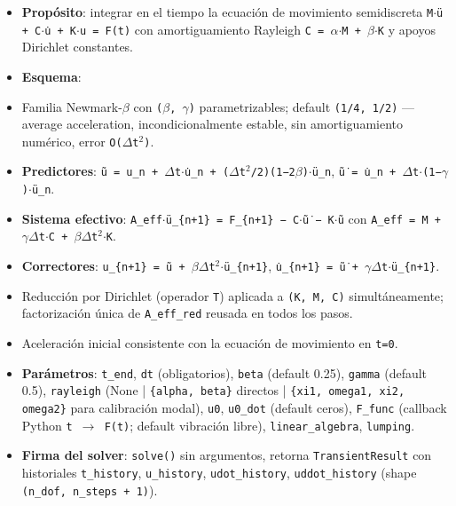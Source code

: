 \documentclass[11pt,letterpaper,oneside]{report}
\begin{document}
\begin{itemize}
  \item \textbf{Propósito}: integrar en el tiempo la ecuación de movimiento semidiscreta \texttt{M\ensuremath{\cdot}ü + C\ensuremath{\cdot}u̇ + K\ensuremath{\cdot}u = F(t)} con amortiguamiento Rayleigh \texttt{C = \ensuremath{\alpha}\ensuremath{\cdot}M + \ensuremath{\beta}\ensuremath{\cdot}K} y apoyos Dirichlet constantes.
  \item \textbf{Esquema}:
  \item Familia Newmark-\ensuremath{\beta} con \texttt{(\ensuremath{\beta}, \ensuremath{\gamma})} parametrizables; default \texttt{(1/4, 1/2)} --- average acceleration, incondicionalmente estable, sin amortiguamiento numérico, error \texttt{O(\ensuremath{\Delta}t\ensuremath{^{2}})}.
  \item \textbf{Predictores}: \texttt{ũ = u\_n + \ensuremath{\Delta}t\ensuremath{\cdot}u̇\_n + (\ensuremath{\Delta}t\ensuremath{^{2}}/2)(1−2\ensuremath{\beta})\ensuremath{\cdot}ü\_n}, \texttt{ũ̇ = u̇\_n + \ensuremath{\Delta}t\ensuremath{\cdot}(1−\ensuremath{\gamma})\ensuremath{\cdot}ü\_n}.
  \item \textbf{Sistema efectivo}: \texttt{A\_eff\ensuremath{\cdot}ü\_\{n+1\} = F\_\{n+1\} − C\ensuremath{\cdot}ũ̇ − K\ensuremath{\cdot}ũ} con \texttt{A\_eff = M + \ensuremath{\gamma}\ensuremath{\Delta}t\ensuremath{\cdot}C + \ensuremath{\beta}\ensuremath{\Delta}t\ensuremath{^{2}}\ensuremath{\cdot}K}.
  \item \textbf{Correctores}: \texttt{u\_\{n+1\} = ũ + \ensuremath{\beta}\ensuremath{\Delta}t\ensuremath{^{2}}\ensuremath{\cdot}ü\_\{n+1\}}, \texttt{u̇\_\{n+1\} = ũ̇ + \ensuremath{\gamma}\ensuremath{\Delta}t\ensuremath{\cdot}ü\_\{n+1\}}.
  \item Reducción por Dirichlet (operador \texttt{T}) aplicada a \texttt{(K, M, C)} simultáneamente; factorización única de \texttt{A\_eff\_red} reusada en todos los pasos.
  \item Aceleración inicial consistente con la ecuación de movimiento en \texttt{t=0}.
  \item \textbf{Parámetros}: \texttt{t\_end}, \texttt{dt} (obligatorios), \texttt{beta} (default 0.25), \texttt{gamma} (default 0.5), \texttt{rayleigh} (None | \texttt{\{alpha, beta\}} directos | \texttt{\{xi1, omega1, xi2, omega2\}} para calibración modal), \texttt{u0}, \texttt{u0\_dot} (default ceros), \texttt{F\_func} (callback Python \texttt{t \ensuremath{\to} F(t)}; default vibración libre), \texttt{linear\_algebra}, \texttt{lumping}.
  \item \textbf{Firma del solver}: \texttt{solve()} sin argumentos, retorna \texttt{TransientResult} con historiales \texttt{t\_history}, \texttt{u\_history}, \texttt{udot\_history}, \texttt{uddot\_history} (shape \texttt{(n\_dof, n\_steps + 1)}).

\end{itemize}
\end{document}
